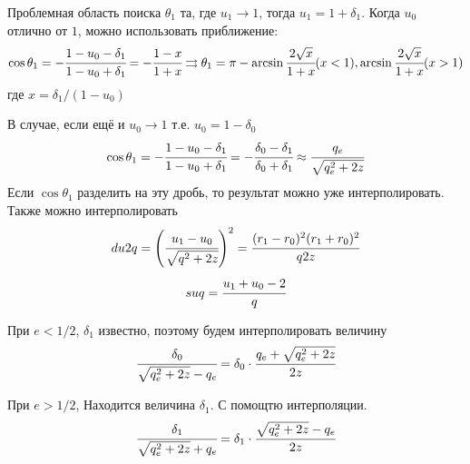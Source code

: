 \documentclass[a4paper, 14pt]{article}
\begin{document}
	Проблемная область поиска $\theta_1$ та, где $u_1 \rightarrow 1$, тогда $u_1 = 1 + \delta_1$. Когда $u_0$ отлично от $1$, можно использовать приближение:
	\begin{equation*}
		\cos {\theta_1} = -\cfrac{1-u_0-\delta_1}{1-u_0+\delta_1} = -\cfrac{1-x}{1+x} \rightrightarrows \theta_1 =  \pi - \arcsin {\cfrac{2\sqrt{x}}{1+x} } (x < 1), \arcsin {\cfrac{2\sqrt{x}}{1+x} } (x > 1)
	\end{equation*} 
	где $x = \delta_1/(1-u_0)$
	
	В случае, если ещё и $u_0 \rightarrow 1$ т.е. $u_0 = 1 - \delta_0$
	\begin{equation*}
		\cos {\theta_1} = -\cfrac{1-u_0-\delta_1}{1-u_0+\delta_1} = 
		-\cfrac{\delta_0-\delta_1}{\delta_0+\delta_1}
		\approx \cfrac{q_e}{\sqrt{q_e^2 + 2z}}
	\end{equation*}
	Если $\cos {\theta_1}$ разделить на эту дробь, то результат можно уже интерполировать.
	Также можно интерполировать 
	\begin{equation*}
		du2q = \left(\cfrac{u_1-u_0}{\sqrt{q^2+2z}}\right)^2 = \cfrac{(r_1-r_0)^2(r_1+r_0)^2}{q2z}
	\end{equation*}
	\begin{equation*}
		suq = \cfrac{u_1+u_0 - 2}{q}
	\end{equation*}
	
	При $e < 1/2$, $\delta_1$ известно, поэтому будем интерполировать величину
	\begin{equation*}
		\cfrac{\delta_0}{\sqrt{q_e^2+2z} - q_e} = 
		\delta_0\cdot\cfrac{q_e+\sqrt{q_e^2+2z}}{2z}
	\end{equation*}
	
	При $e > 1/2$, Находится величина $\delta_1$. С помощтю интерполяции.
	\begin{equation*}
		\cfrac{\delta_1}{\sqrt{q_e^2+2z} + q_e} = 
		\delta_1\cdot\cfrac{\sqrt{q_e^2+2z }- q_e}{2z}
	\end{equation*}
	
\end{document}
